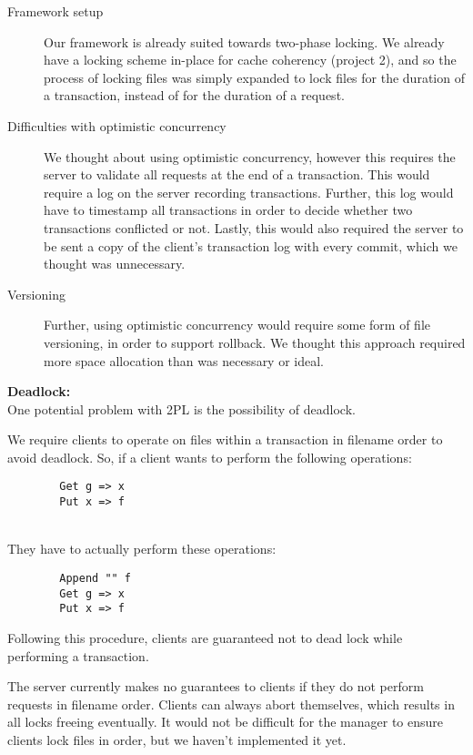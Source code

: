\documentclass[11pt]{article}
\begin{document}
\begin{description}
	\item[Framework setup] Our framework is already suited towards two-phase locking. We already have a locking scheme in-place for cache coherency (project 2), and so the process of locking files was 
simply expanded to lock files for the duration of a transaction, instead of for the duration of a request.
	\item[Difficulties with optimistic concurrency] We thought about using optimistic concurrency, however this requires the server to validate all requests at the end of a transaction. This would require
a log on the server recording transactions. Further, this log would have to timestamp all transactions in order to decide whether two transactions conflicted or not. Lastly, this would also required the
server to be sent a copy of the client's transaction log with every commit, which we thought was unnecessary. 
        \item[Versioning] Further, using optimistic concurrency would require some form of file versioning, in order to support rollback. We thought this approach required more space allocation than was necessary or ideal.
\end{description}

\textbf{Deadlock:} \\

One potential problem with 2PL is the possibility of deadlock.

We require clients to operate on files within a transaction in filename order to avoid deadlock.
So, if a client wants to perform the following operations: 
\begin{verbatim}
        Get g => x
        Put x => f
\end{verbatim}\\
They have to actually perform these operations:
\begin{verbatim}
        Append "" f
        Get g => x
        Put x => f
\end{verbatim}

Following this procedure, clients are guaranteed not to dead lock while performing a transaction.

The server currently makes no guarantees to clients if they do not perform requests in filename order. Clients can always abort themselves, which results in all locks freeing eventually. It would not be difficult for the manager to ensure clients lock files in order, but we haven't implemented it yet. \\
\end{document}
